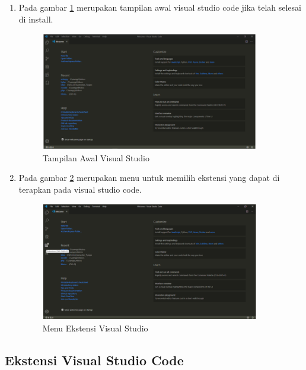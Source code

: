 \begin{enumerate}
\item Pada gambar \ref{V13} merupakan tampilan awal visual studio code jika telah selesai di install.
\begin{figure}[!htbp]
	\centerline{\includegraphics[width=0.90\textwidth]{figures/vs/13.png}}
	\caption{Tampilan Awal Visual Studio}
	\label{V13}
\end{figure}

\item Pada gambar \ref{V14}  merupakan menu untuk memilih ekstensi yang dapat di terapkan pada visual studio code.\par
\begin{figure}[!htbp]
	\centerline{\includegraphics[width=0.90\textwidth]{figures/vs/14.png}}
	\caption{Menu Ekstensi Visual Studio}
	\label{V14}
\end{figure}
\pagebreak

\end{enumerate}


\subsection{Ekstensi Visual Studio Code}

